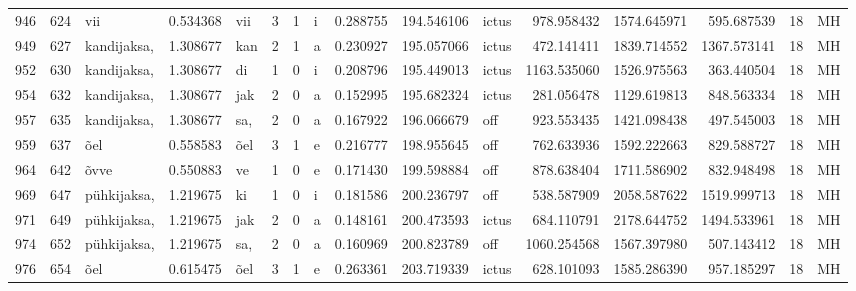 \begin{tabular}{lrlrllllrrlrrrll}
946  &         624 &              vii &  0.534368 &     vii &        3 &      1 &       i &      0.288755 &    194.546106 &  ictus &   978.958432 &  1574.645971 &   595.687539 &     18 &        MH \\
949  &         627 &      kandijaksa, &  1.308677 &     kan &        2 &      1 &       a &      0.230927 &    195.057066 &  ictus &   472.141411 &  1839.714552 &  1367.573141 &     18 &        MH \\
952  &         630 &      kandijaksa, &  1.308677 &      di &        1 &      0 &       i &      0.208796 &    195.449013 &  ictus &  1163.535060 &  1526.975563 &   363.440504 &     18 &        MH \\
954  &         632 &      kandijaksa, &  1.308677 &     jak &        2 &      0 &       a &      0.152995 &    195.682324 &  ictus &   281.056478 &  1129.619813 &   848.563334 &     18 &        MH \\
957  &         635 &      kandijaksa, &  1.308677 &     sa, &        2 &      0 &       a &      0.167922 &    196.066679 &    off &   923.553435 &  1421.098438 &   497.545003 &     18 &        MH \\
959  &         637 &              õel &  0.558583 &     õel &        3 &      1 &       e &      0.216777 &    198.955645 &    off &   762.633936 &  1592.222663 &   829.588727 &     18 &        MH \\
964  &         642 &             õvve &  0.550883 &      ve &        1 &      0 &       e &      0.171430 &    199.598884 &    off &   878.638404 &  1711.586902 &   832.948498 &     18 &        MH \\
969  &         647 &      pühkijaksa, &  1.219675 &      ki &        1 &      0 &       i &      0.181586 &    200.236797 &    off &   538.587909 &  2058.587622 &  1519.999713 &     18 &        MH \\
971  &         649 &      pühkijaksa, &  1.219675 &     jak &        2 &      0 &       a &      0.148161 &    200.473593 &  ictus &   684.110791 &  2178.644752 &  1494.533961 &     18 &        MH \\
974  &         652 &      pühkijaksa, &  1.219675 &     sa, &        2 &      0 &       a &      0.160969 &    200.823789 &    off &  1060.254568 &  1567.397980 &   507.143412 &     18 &        MH \\
976  &         654 &              õel &  0.615475 &     õel &        3 &      1 &       e &      0.263361 &    203.719339 &  ictus &   628.101093 &  1585.286390 &   957.185297 &     18 &        MH \\

\end{tabular}
